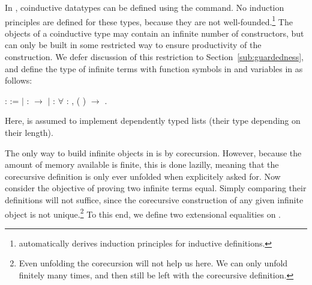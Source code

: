 In \Coq, coinductive datatypes can be defined using the 
command. No induction principles are defined for these types, because they are
not well-founded.\footnote{\Coq automatically derives induction principles for
  inductive definitions.} The objects of a coinductive type may contain an
infinite number of constructors, but can only be built in some restricted way
to ensure productivity of the construction.
We defer discussion of this restriction to Section~\ref{sub:guardedness}, and
define the type  of infinite terms
with function symbols in  and variables in  as
follows:
\begin{singlespace}
\begin{coqdoccode}
\coqdocnoindent
{}  :
 :=\coqdoceol
\coqdocindent{1.00em}
\ensuremath{|}  : 
\ensuremath{\rightarrow} \coqdoceol
\coqdocindent{1.00em}
\ensuremath{|}  :
\ensuremath{\forall}  : ,
( )
\ensuremath{\rightarrow} .\coqdoceol
\end{coqdoccode}
\end{singlespace}
Here,  is assumed to implement dependently typed
lists (their type depending on their length).

The only way to build infinite objects in \Coq is by corecursion. However,
because the amount of memory available is finite, this is done lazilly,
meaning that the corecursive definition is only ever unfolded when explicitely
asked for. Now consider the objective of proving two infinite terms
equal. Simply comparing their definitions will not suffice, since the
corecursive construction of any given infinite object is not
unique.\footnote{Even unfolding the corecursion will not help us here. We can
  only unfold finitely many times, and then still be left with the corecursive
  definition.} To this end, we define two extensional equalities on
.


